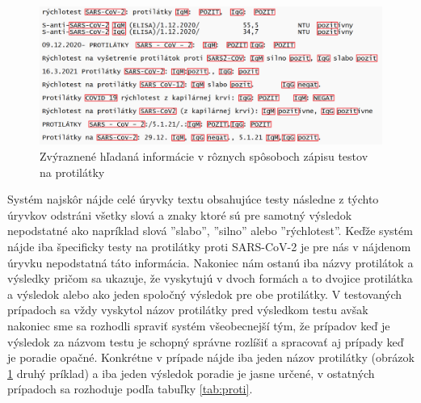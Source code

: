 \begin{figure}
	\centerline{\includegraphics[width=1\textwidth]{images/protilatky_highlight}}
	\caption[Protilátky zvýraznené]{Zvýraznené hľadaná informácie v rôznych spôsoboch zápisu testov na protilátky}
	\label{obr:proti_high}
\end{figure}

Systém najskôr nájde celé úryvky textu obsahujúce testy následne z týchto úryvkov odstráni všetky slová a znaky ktoré sú pre samotný výsledok nepodstatné ako napríklad slová ''slabo'', ''silno'' alebo ''rýchlotest''. Keďže systém nájde iba špecificky testy na protilátky proti SARS-CoV-2 je pre nás v nájdenom úryvku nepodstatná táto informácia. Nakoniec nám ostanú iba názvy protilátok a výsledky pričom sa ukazuje, že vyskytujú v dvoch formách a to dvojice protilátka a výsledok alebo ako jeden spoločný výsledok pre obe protilátky. V testovaných prípadoch sa vždy vyskytol názov protilátky pred výsledkom testu avšak nakoniec sme sa rozhodli spraviť systém všeobecnejší tým, že prípadov keď je výsledok za názvom testu je schopný správne rozlíšiť a spracovať aj prípady keď je poradie opačné. Konkrétne v prípade nájde iba jeden 
názov protilátky (obrázok \ref{obr:proti_high} druhý príklad) a iba jeden výsledok poradie je jasne určené, v ostatných prípadoch sa rozhoduje podľa tabuľky \ref{tab:proti}.

